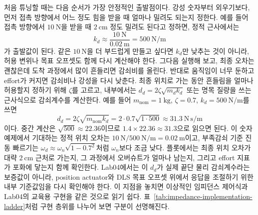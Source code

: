 처음 튜닝할 때는 다음 순서가 가장 안정적인 출발점이다.
강성 숫자부터 외우기보다, 먼저 접촉 방향에서 어느 정도 힘을 받을 때 얼마나 밀려도 되는지 정한다.
예를 들어 접촉 방향에서 $10~\mathrm{N}$을 받을 때 $2~\mathrm{cm}$ 정도 밀려도 된다고 정하면, 정적 근사에서는
\begin{equation}
  k_d \approx \frac{10~\mathrm{N}}{0.02~\mathrm{m}}
  =
  500~\mathrm{N/m}
\end{equation}
가 출발값이 된다.
같은 $10~\mathrm{N}$을 더 부드럽게 만들고 싶다면 $k_d$만 낮추는 것이 아니라, 허용 변위나 목표 오프셋도 함께 다시 계산해야 한다.
그다음 실행해 보고, 최종 오차는 괜찮은데 도착 과정에서 많이 흔들리면 감쇠비를 올린다.
반대로 움직임이 너무 둔하고 effort가 커지면 감쇠비나 강성을 다시 낮춘다.
최종 위치로 가는 동안 흔들림을 얼마나 허용할지 정하기 위해 $\zeta$를 고르고, 내부에서는 $d_d=2\zeta\sqrt{m_dk_d}$ 또는 명목 질량을 쓰는 근사식으로 감쇠계수를 계산한다.
예를 들어 $m_{\mathrm{nom}}=1~\mathrm{kg}$, $\zeta=0.7$, $k_d=500~\mathrm{N/m}$를 쓰면
\begin{equation}
  d_d
  =
  2\zeta\sqrt{m_{\mathrm{nom}}k_d}
  =
  2\cdot0.7\sqrt{1\cdot500}
  \approx
  31.3~\mathrm{N\,s/m}
\end{equation}
이다.
중간 계산은 $\sqrt{500}\approx22.36$이므로 $1.4\times22.36\approx31.3$으로 읽으면 된다.
%
이 숫자 예제에서 기대하는 정적 위치 오차는 $10~\mathrm{N}/500~\mathrm{N/m}=0.02~\mathrm{m}$이고, 부족감쇠 기준 진동 빠르기는 $\omega_d\approx \omega_n\sqrt{1-0.7^2}$처럼 $\omega_n$보다 조금 낮다.
플롯에서는 최종 위치 오차가 대략 $2~\mathrm{cm}$ 근처로 가는지, 그 과정에서 오버슈트가 얼마나 남는지, 그리고 effort 지표가 포화에 닿는지 함께 확인한다.
Lab04에서는 이 $d_d$가 실제 끝단 물리 감쇠계수라는 보증값이 아니라, position actuator와 DLS 목표 오프셋 위에서 응답을 조절하기 위한 내부 기준값임을 다시 확인해야 한다.
이 지점을 놓치면 이상적인 임피던스 제어식과 Lab04의 교육용 구현을 같은 것으로 읽기 쉽다.
표~\ref{tab:impedance-implementation-ladder}처럼 구현 층위를 나누어 보면 구분이 선명해진다.

